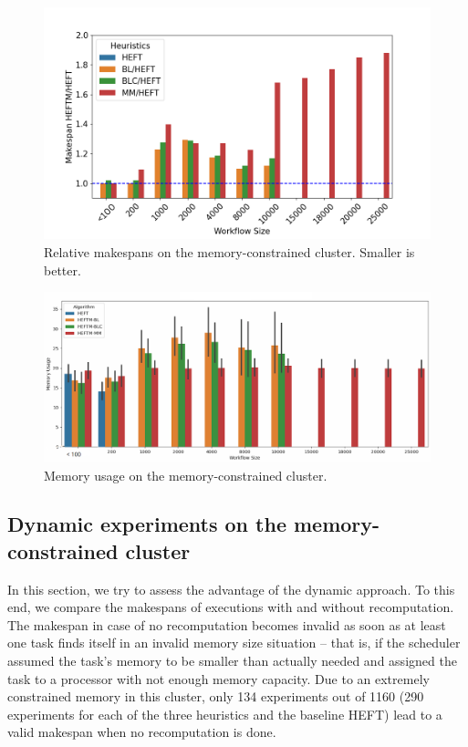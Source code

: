 \documentclass[conference]{IEEEtran}
\newcommand{\algo}[1]{\textsc{#1}}
\newcommand{\heft}{\algo{HEFT}\xspace}
\newcommand{\new}[1]{{#1}}
\begin{document}
\begin{figure}[tb]
    \centering
    \vspace{-0.3cm}
    \includegraphics[width=1.03\columnwidth] {images/ms_relations_by_wf_size-constrained-barplot}
    \caption{Relative makespans on the memory-constrained cluster.
    Smaller is better.}
    \label{fig:ms-relations-by-workflow-constrained}
\end{figure}


\begin{figure}[tb]
    \centering
    \includegraphics[width=1\columnwidth] {images/mem-usage-constrained-onlyvalid2}
    \caption{Memory usage on the memory-constrained  cluster. } %
    \label{fig:memory-usage-constrained}
\end{figure}


    
\subsection{Dynamic experiments on the memory-constrained cluster}
\label{sec.expe.dyn}
\new{In this section, we try to assess the advantage of the dynamic approach.
To this end, we compare the makespans of executions with and without recomputation.}
The makespan in case of no recomputation becomes invalid as soon as at least one task finds itself in an invalid memory size
situation -- that is, if the scheduler assumed the task's memory to be smaller than actually needed and
assigned the task to a processor with not enough memory capacity.
Due to an extremely constrained memory in this cluster, only 134 experiments out of 1160
(290 experiments for each of the three heuristics and the baseline \heft)
 \new{lead to a valid makespan when no recomputation is done}.
\end{document}
